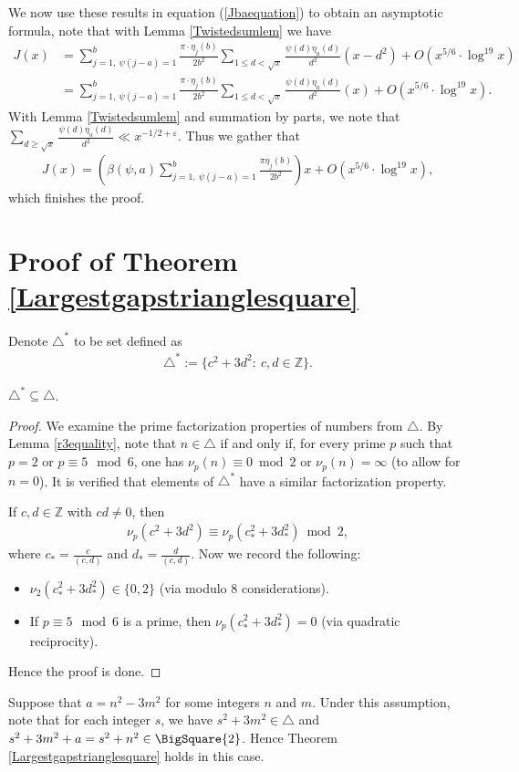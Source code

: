 \documentclass[12pt]{amsart}
\newcommand{\1}{\mathmybb{1}}
\begin{document}
We now use these results in equation (\ref{Jbaequation}) to obtain an asymptotic formula, note that with Lemma \ref{Twistedsumlem} we have
\begin{align*}
J(x) &= \sum_{j=1, \ \psi(j-a) = 1}^{b}\frac{\pi\cdot \eta_{j}(b)}{2b^2}\sum_{1 \leq d < \sqrt{x}}\frac{\psi(d)\eta_{a}(d)}{d^2}(x-d^2) + O(x^{5/6}\cdot\log^{19}x)\\
&= \sum_{j=1, \ \psi(j-a) = 1}^{b}\frac{\pi\cdot \eta_{j}(b)}{2b^2}\sum_{1 \leq d < \sqrt{x}}\frac{\psi(d)\eta_{a}(d)}{d^2}(x)+O(x^{5/6}\cdot\log^{19}x).
\end{align*}
With Lemma \ref{Twistedsumlem} and summation by parts, we note that $\sum_{d \geq \sqrt{x}}\frac{\psi(d)\eta_{a}(d)}{d^2} \ll x^{-1/2+\varepsilon}$. Thus we gather that
\begin{align*}
J(x) = \left(\beta(\psi,a)\sum_{j=1, \ \psi(j-a) = 1}^{b}\frac{\pi \eta_{j}(b)}{2b^2}\right)x + O(x^{5/6}\cdot\log^{19}x),
\end{align*}
which finishes the proof.
\section{Proof of Theorem \ref{Largestgapstrianglesquare}}
Denote $\triangle^{*}$ to be set defined as
\begin{align*}
\triangle^{*}:= \{c^2+3d^2: \ c,d \in \mathbb{Z}\}.
\end{align*}
\begin{lem}
$\triangle^{*} \subseteq \triangle$.
\end{lem}
\begin{proof}
We examine the prime factorization properties of numbers from $\triangle$. By Lemma \ref{r3equality}, note that $n \in \triangle$ if and only if, for every prime $p$ such that $p = 2$ or $p \equiv 5 \mod 6$, one has $\nu_p(n) \equiv 0 \bmod 2$ or $\nu_p(n) = \infty$ (to allow for $n = 0$). It is verified that elements of $\triangle^{*}$ have a similar factorization property. 

If $c,d \in \mathbb{Z}$ with $cd \neq 0$, then
\begin{align*}
\nu_{p}(c^2+3d^2) \equiv \nu_{p}(c_{*}^2 +3d_{*}^2) \bmod 2,
\end{align*}
where $c_{*} = \frac{c}{(c,d)}$ and $d_{*} = \frac{d}{(c,d)}$. Now we record the following:
\begin{itemize}
\item $\nu_{2}(c_{*}^2+3d_{*}^2) \in \{0,2\}$ (via modulo $8$ considerations).
\item If $p \equiv 5 \mod 6$ is a prime, then $\nu_{p}(c_{*}^2+3d_{*}^2) = 0$ (via quadratic reciprocity).
\end{itemize}
Hence the proof is done.
\end{proof}
Suppose that $a  = n^2 - 3m^2$ for some integers $n$ and $m$. Under this assumption, note that for each integer $s$, we have $s^2 +3m^2 \in \triangle$ and $s^2+3m^2+a = s^2+n^2 \in \BigSquare{2}$. Hence Theorem \ref{Largestgapstrianglesquare} holds in this case.
\end{document}
